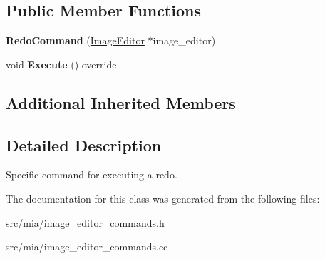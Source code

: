 \subsection*{Public Member Functions}
\begin{DoxyCompactItemize}
\item 
\mbox{\label{classimage__tools_1_1RedoCommand_a7077e1a8dab12f4d941ec8cc1431fcbb}} 
{\bfseries Redo\+Command} (\hyperlink{classimage__tools_1_1ImageEditor}{Image\+Editor} $\ast$image\+\_\+editor)
\item 
\mbox{\label{classimage__tools_1_1RedoCommand_abd1811d6cba4a95c949e963a6753137f}} 
void {\bfseries Execute} () override
\end{DoxyCompactItemize}
\subsection*{Additional Inherited Members}


\subsection{Detailed Description}
Specific command for executing a redo. 

The documentation for this class was generated from the following files\+:\begin{DoxyCompactItemize}
\item 
src/mia/image\+\_\+editor\+\_\+commands.\+h\item 
src/mia/image\+\_\+editor\+\_\+commands.\+cc\end{DoxyCompactItemize}
